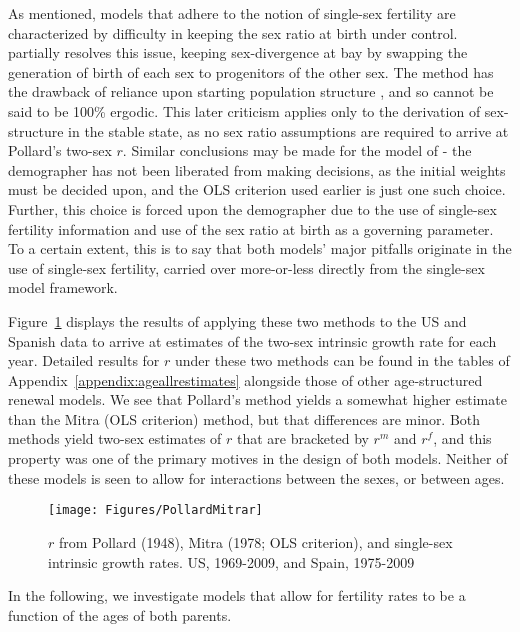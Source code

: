 \FloatBarrier
As mentioned, models that adhere to the notion of single-sex fertility are
characterized by difficulty in keeping the sex ratio at birth under control.
\citet{pollard1948measurement} partially resolves this issue, keeping
sex-divergence at bay by swapping the generation of birth of each sex to
progenitors of the other sex. The method has the drawback of reliance upon
starting population structure \citep{yntema1952mathematical}, and so cannot be
said to be 100\% ergodic. This later criticism applies only to the derivation of
sex-structure in the stable state, as no sex ratio assumptions are required to arrive at Pollard's two-sex
$r$. Similar conclusions may be made for the model of
\citet{mitra1978derivation}- the demographer has not been liberated from making
decisions, as the initial weights must be decided upon, and the OLS criterion
used earlier is just one such choice. Further, this choice is forced upon the
demographer due to the use of single-sex fertility information and use of the
sex ratio at birth as a governing parameter. To a certain extent, this is to say
that both models' major pitfalls originate in the use of single-sex fertility,
carried over more-or-less directly from the single-sex model framework.

Figure~\ref{fig:PollardMitrar} displays the results of applying these two
methods to the US and Spanish data to arrive at estimates of the two-sex 
intrinsic growth rate for each year.  Detailed 
results for $r$ under these two methods can be found in the tables of
Appendix~\ref{appendix:ageallrestimates} alongside those of other
age-structured renewal models. We see that
Pollard's method yields a somewhat higher estimate than the Mitra (OLS
criterion) method, but that differences are minor. Both methods yield two-sex
estimates of $r$ that are bracketed by $r^m$ and $r^f$, and this property was
one of the primary motives in the design of both models. Neither of these models
is seen to allow for interactions between the sexes, or between ages.

\begin{figure}[ht!]
        \centering  
          \caption{$r$ from Pollard (1948), Mitra (1978; OLS criterion),
          and single-sex intrinsic growth rates. US, 1969-2009, and Spain, 1975-2009}
           \texttt{[image: Figures/PollardMitrar]}
          \label{fig:PollardMitrar}
\end{figure}

In the following, we investigate models that allow for fertility
rates to be a function of the ages of both parents.

\FloatBarrier


